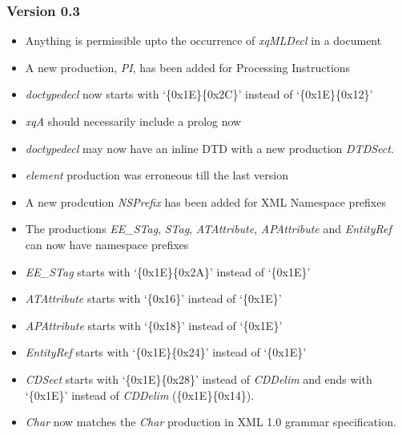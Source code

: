 \documentclass[a4paper]{article}
\begin{document}
\subsubsection{Version 0.3}
\begin{itemize}
\item Anything is permissible upto the occurrence of \textit{xqMLDecl}
  in a document
\item A new production, \textit{PI}, has been added for Processing
  Instructions
\item \textit{doctypedecl} now starts with `\{0x1E\}\{0x2C\}' instead
  of `\{0x1E\}\{0x12\}'
\item \textit{xqA} should necessarily include a prolog now
\item \textit{doctypedecl} may now have an inline DTD with a new
  production \textit{DTDSect}.
\item \textit{element} production was erroneous till the last
  version
\item A new prodcution \textit{NSPrefix} has been added for XML
  Namespace prefixes
\item The productions \textit{EE\_STag}, \textit{STag},
  \textit{ATAttribute}, \textit{APAttribute} and \textit{EntityRef}
  can now have namespace prefixes
\item \textit{EE\_STag} starts with `\{0x1E\}\{0x2A\}' instead of
  `\{0x1E\}'
\item \textit{ATAttribute} starts with `\{0x16\}' instead of
  `\{0x1E\}'
\item \textit{APAttribute} starts with `\{0x18\}' instead of
  `\{0x1E\}'
\item \textit{EntityRef} starts with `\{0x1E\}\{0x24\}' instead of
  `\{0x1E\}'
\item \textit{CDSect} starts with `\{0x1E\}\{0x28\}' instead of
  \textit{CDDelim} and ends with `\{0x1E\}' instead of
  \textit{CDDelim} (\{0x1E\}\{0x14\}).
\item \textit{Char} now matches the \textit{Char} production in XML
  1.0 grammar specification.
\end{itemize}
\end{document}
